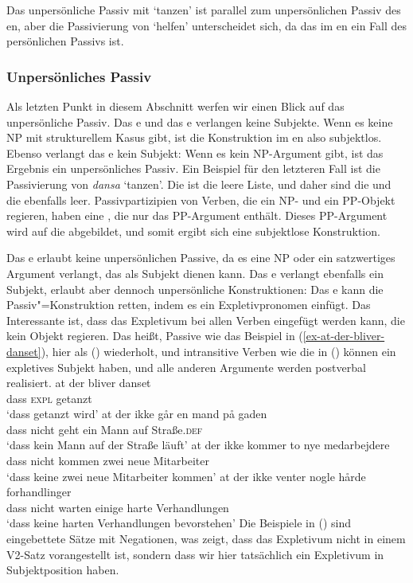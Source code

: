 \noindent
Das unpersönliche Passiv mit `tanzen' ist parallel zum unpersönlichen Passiv des en, aber die
Passivierung von `helfen' unterscheidet sich, da das im en ein Fall des persönlichen Passivs ist.

\subsubsection{Unpersönliches Passiv}
\label{sec-impersonals}

Als letzten Punkt in diesem Abschnitt werfen wir einen Blick auf das unpersönliche Passiv. Das e und das
e verlangen keine Subjekte. Wenn es keine NP mit strukturellem Kasus gibt, ist die Konstruktion im
en also subjektlos. Ebenso verlangt das e kein Subjekt: Wenn es kein NP-Argument gibt,
ist das Ergebnis ein unpersönliches Passiv. Ein Beispiel für den letzteren Fall ist die Passivierung von
\emph{dansa} `tanzen'. Die \argstl ist die leere Liste, und daher sind die \sprl und die \compsl
ebenfalls leer. Passivpartizipien von Verben, die ein NP- und ein PP-Objekt regieren, haben eine \argstl,
die nur das PP-Argument enthält. Dieses PP-Argument wird auf die \compsl abgebildet, und somit ergibt sich eine
subjektlose Konstruktion.

Das e erlaubt keine unpersönlichen Passive, da es eine NP oder ein satzwertiges Argument verlangt, das
als Subjekt dienen kann. Das e verlangt ebenfalls ein Subjekt, erlaubt aber dennoch unpersönliche
Konstruktionen: Das e kann die Passiv"=Konstruktion retten, indem es ein
Expletivpronomen einfügt. Das Interessante ist, dass das Expletivum bei allen
Verben eingefügt werden kann, die kein Objekt regieren. Das heißt, Passive wie das Beispiel in
(\ref{ex-at-der-bliver-danset}), hier als () wiederholt, und intransitive Verben wie die in
() können ein expletives Subjekt haben, und alle anderen Argumente werden postverbal
realisiert.
\ea
\gll at der bliver danset\\
     dass \textsc{expl} \AUX{} getanzt\\\danish
\glt `dass getanzt wird'
\z
\eal
\label{ex-Intransitive-EXPL}
\ex 
\gll at    der    ikke går   en mand på gaden\\
     dass \expl{} nicht geht ein Mann auf Straße.\textsc{def}\\\danish
\glt `dass kein Mann auf der Straße läuft'
\ex 
\gll at   der     ikke kommer to  nye medarbejdere\\
     dass \expl{} nicht kommen zwei neue Mitarbeiter\\
\glt `dass keine zwei neue Mitarbeiter kommen'
\ex
\gll at   der     ikke venter nogle hårde forhandlinger\\
     dass \expl{} nicht warten einige harte Verhandlungen\\
\glt `dass keine harten Verhandlungen bevorstehen'
\zl
Die Beispiele in () sind eingebettete Sätze mit Negationen, was zeigt, dass das Expletivum nicht
in einem V2-Satz vorangestellt ist, sondern dass wir hier tatsächlich ein Expletivum in Subjektposition haben.

